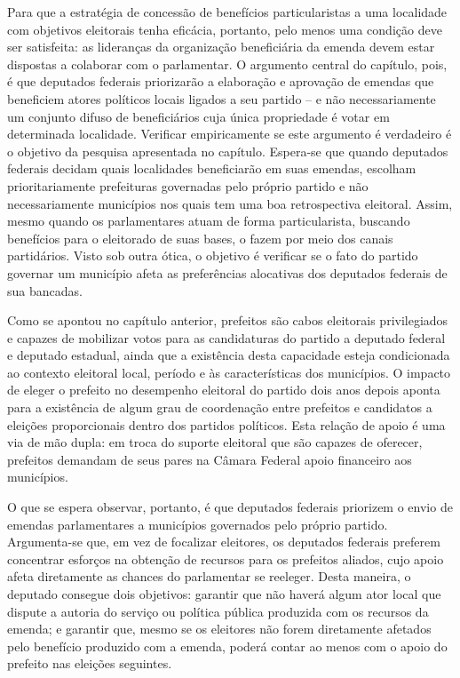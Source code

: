 Para que a estratégia de concessão de benefícios particularistas a uma localidade com objetivos eleitorais tenha eficácia, portanto, pelo menos uma condição deve ser satisfeita: as lideranças da organização beneficiária da emenda devem estar dispostas a colaborar com o parlamentar. O argumento central do capítulo, pois, é que deputados federais priorizarão a elaboração e aprovação de emendas que beneficiem atores políticos locais ligados a seu partido -- e não necessariamente um conjunto difuso de beneficiários cuja única propriedade é votar em determinada localidade. Verificar empiricamente se este argumento é verdadeiro é o objetivo da pesquisa apresentada no capítulo. Espera-se que quando deputados federais decidam quais localidades beneficiarão em suas emendas, escolham prioritariamente prefeituras governadas pelo próprio partido e não necessariamente municípios nos quais tem uma boa retrospectiva eleitoral. Assim, mesmo quando os parlamentares atuam de forma particularista, buscando benefícios para o eleitorado de suas bases, o fazem por meio dos canais partidários. Visto sob outra ótica, o objetivo é verificar se o fato do partido governar um município afeta as preferências alocativas dos deputados federais de sua bancadas.

Como se apontou no capítulo anterior, prefeitos são cabos eleitorais privilegiados e capazes de mobilizar votos para as candidaturas do partido a deputado federal e deputado estadual, ainda que a existência desta capacidade esteja condicionada ao contexto eleitoral local, período e às características dos municípios. O impacto de eleger o prefeito no desempenho eleitoral do partido dois anos depois aponta para a existência de algum grau de coordenação entre prefeitos e candidatos a eleições proporcionais dentro dos partidos políticos. Esta relação de apoio é uma via de mão dupla: em troca do suporte eleitoral que são capazes de oferecer, prefeitos demandam de seus pares na Câmara Federal apoio financeiro aos municípios.

O que se espera observar, portanto, é que deputados federais priorizem o envio de emendas parlamentares a municípios governados pelo próprio partido. Argumenta-se que, em vez de focalizar eleitores, os deputados federais preferem concentrar esforços na obtenção de recursos para os prefeitos aliados, cujo apoio afeta diretamente as chances do parlamentar se reeleger. Desta maneira, o deputado consegue dois objetivos: garantir que não haverá algum ator local que dispute a autoria do serviço ou política pública produzida com os recursos da emenda; e garantir que, mesmo se os eleitores não forem diretamente afetados pelo benefício produzido com a emenda, poderá contar ao menos com o apoio do prefeito nas eleições seguintes.

